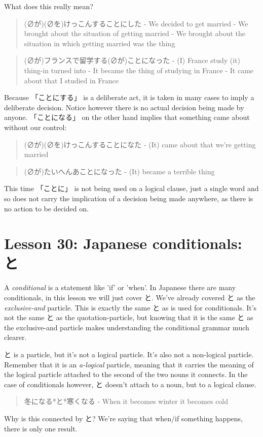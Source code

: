 \documentclass[11pt]{article}
\begin{document}
What does this really mean?
\begin{quote}
(∅が)(∅を)けっこんすることにした - We decided to get married - We brought about the situation of getting married - We brought about the situation in which getting married was the thing
\end{quote}

\begin{quote}
(∅が)フランスで留学する(∅が)ことになった - (I) France study (it) thing-in turned into - It became the thing of studying in France - It came about that I studied in France
\end{quote}
Because 「ことにする」 is a deliberate act, it is taken in many cases to imply a deliberate decision. Notice however there is no actual decision being made by anyone. 「ことになる」 on the other hand implies that something came about without our control:
\begin{quote}
(∅が)(∅を)けっこんすることになた - (It) came about that we're getting married
\end{quote}

\begin{quote}
(∅が)たいへんあことになった - (It) became a terrible thing
\end{quote}
This time 「ことに」 is not being used on a logical clause, just a single word and so does not carry the implication of a decision being made anywhere, as there is no action to be decided on.

\section{Lesson 30: Japanese conditionals: と}
\label{sec:orgc4f2fa4}
A \emph{conditional} is a statement like 'if' or 'when'. In Japanese there are many conditionals, in this lesson we will just cover と. We've already covered と as the \emph{exclusive-and} particle. This is exactly the same と as is used for conditionals. It's not the same と as the quotation-particle, but knowing that it is the same と as the exclusive-and particle makes understanding the conditional grammar much clearer.

と is a particle, but it's not a logical particle. It's also not a non-logical particle. Remember that it is an \emph{a-logical} particle, meaning that it carries the meaning of the logical particle attached to the second of the two nouns it connects. In the case of conditionals however, と doesn't attach to a noun, but to a logical clause.
\begin{quote}
冬になる*と*寒くなる - When it becomes winter it becomes cold
\end{quote}
Why is this connected by と? We're saying that when/if something happens, there is only one result.
\end{document}
